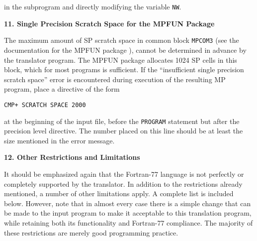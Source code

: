 \noindent
in the subprogram and directly modifying the variable {\tt NW}.

\vspace{2ex} \noindent
{\bf 11. Single Precision Scratch Space for the MPFUN Package}
 
The maximum amount of SP scratch space in common block {\tt MPCOM3}
(see the documentation for the MPFUN package \cite{dhb1}), cannot be
determined in advance by the translator program.  The MPFUN package
allocates 1024 SP cells in this block, which for most programs is
sufficient.  If the ``insufficient single precision scratch space''
error is encountered during execution of the resulting MP program,
place a directive of the form
 
\begin{tt} \begin{small} \begin{verbatim}
CMP+ SCRATCH SPACE 2000
\end{verbatim} \end{small} \end{tt}
 
\noindent
at the beginning of the input file, before the {\tt PROGRAM} statement
but after the precision level directive.  The number placed on this
line should be at least the size mentioned in the error message.
 
\vspace{2ex} \noindent
{\bf 12. Other Restrictions and Limitations}

It should be emphasized again that the Fortran-77 language is not
perfectly or completely supported by the translator.  In addition to
the restrictions already mentioned, a number of other limitations
apply.  A complete list is included below.  However, note that in
almost every case there is a simple change that can be made to the
input program to make it acceptable to this translation program, while
retaining both its functionality and Fortran-77 compliance.  The
majority of these restrictions are merely good programming practice.
 
